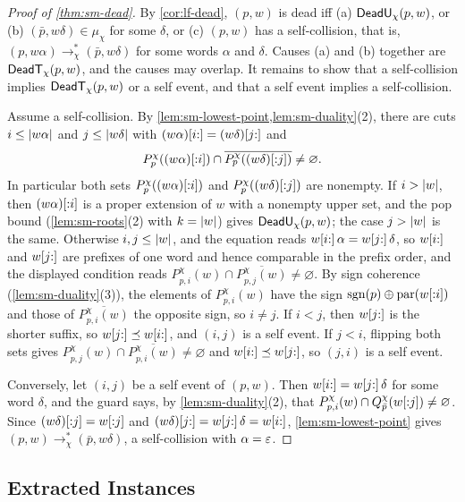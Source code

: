 \begin{proof}[Proof of \cref{thm:sm-dead}]
By \cref{cor:lf-dead}, $(p,w)$ is dead iff (a) $\mathsf{DeadU}_\chi(p,w)$, or (b)
$(\bar p,w\delta)\in\mu_\chi$ for some $\delta$, or (c) $(p,w)$ has a
self-collision, that is, $(p,w\alpha)\to^*_\chi(\bar p,w\delta)$ for some
words $\alpha$ and $\delta$. Causes (a) and (b) together are
$\mathsf{DeadT}_\chi(p,w)$, and the causes may overlap. It remains to show that a
self-collision implies $\mathsf{DeadT}_\chi(p,w)$ or a self event, and that a self
event implies a self-collision.

Assume a self-collision. By \cref{lem:sm-lowest-point,lem:sm-duality}(2), there are cuts
$i\le\lvert w\alpha\rvert$ and $j\le\lvert w\delta\rvert$ with
$(w\alpha)[i{:}]=(w\delta)[j{:}]$ and
\[
 P^\chi_p((w\alpha)[{:}i])\cap\overline{P^\chi_p((w\delta)[{:}j])}
 \ne\varnothing .
\]
In particular both sets $P^\chi_p((w\alpha)[{:}i])$ and
$P^\chi_p((w\delta)[{:}j])$ are nonempty. If $i>\lvert w\rvert$, then
$(w\alpha)[{:}i]$ is a proper extension of $w$ with a nonempty upper set, and
the pop bound (\cref{lem:sm-roots}(2) with $k=\lvert w\rvert$) gives $\mathsf{DeadU}_\chi(p,w)$; the
case $j>\lvert w\rvert$ is the same. Otherwise $i,j\le\lvert w\rvert$, and the equation reads
$w[i{:}]\,\alpha=w[j{:}]\,\delta$, so $w[i{:}]$ and $w[j{:}]$ are prefixes
of one word and hence comparable in the prefix order, and the displayed
condition reads $P^\chi_{p,i}(w)\cap\overline{P^\chi_{p,j}(w)}\ne\varnothing$. By
sign coherence (\cref{lem:sm-duality}(3)), the elements of $P^\chi_{p,i}(w)$
have the sign $\operatorname{sgn}(p)\oplus\operatorname{par}(w[{:}i])$ and those of
$\overline{P^\chi_{p,i}(w)}$ the opposite sign, so $i\ne j$. If $i<j$, then
$w[j{:}]$ is the shorter suffix, so $w[j{:}]\preceq w[i{:}]$, and $(i,j)$ is a
self event. If $j<i$, flipping both sets gives
$P^\chi_{p,j}(w)\cap\overline{P^\chi_{p,i}(w)}\ne\varnothing$ and
$w[i{:}]\preceq w[j{:}]$, so $(j,i)$ is a self event.

Conversely, let $(i,j)$ be a self event of $(p,w)$. Then $w[i{:}]=w[j{:}]\,\delta$
for some word $\delta$, and the guard says, by \cref{lem:sm-duality}(2), that
$P^\chi_{p,i}(w)\cap Q^\chi_{\bar p}(w[{:}j])\ne\varnothing$. Since
$(w\delta)[{:}j]=w[{:}j]$ and $(w\delta)[j{:}]=w[j{:}]\,\delta=w[i{:}]$,
\cref{lem:sm-lowest-point} gives $(p,w)\to^*_\chi(\bar p,w\delta)$, a
self-collision with $\alpha=\varepsilon$.
\end{proof}

\subsection{Extracted Instances}\label{app:sm-extraction}

